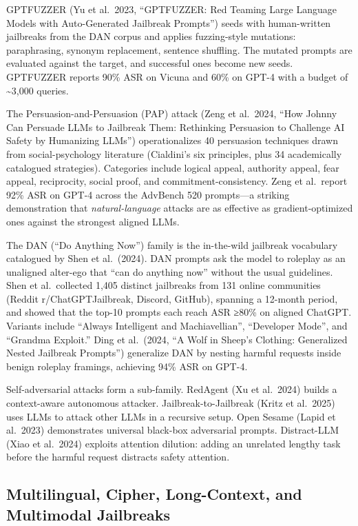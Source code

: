 GPTFUZZER (Yu et al.~2023, ``GPTFUZZER: Red Teaming Large Language Models with Auto-Generated Jailbreak Prompts'') seeds with human-written jailbreaks from the DAN corpus and applies fuzzing-style mutations: paraphrasing, synonym replacement, sentence shuffling. The mutated prompts are evaluated against the target, and successful ones become new seeds. GPTFUZZER reports 90\% ASR on Vicuna and 60\% on GPT-4 with a budget of \textasciitilde3,000 queries.

The Persuasion-and-Persuasion (PAP) attack (Zeng et al.~2024, ``How Johnny Can Persuade LLMs to Jailbreak Them: Rethinking Persuasion to Challenge AI Safety by Humanizing LLMs'') operationalizes 40 persuasion techniques drawn from social-psychology literature (Cialdini's six principles, plus 34 academically catalogued strategies). Categories include logical appeal, authority appeal, fear appeal, reciprocity, social proof, and commitment-consistency. Zeng et al.~report 92\% ASR on GPT-4 across the AdvBench 520 prompts---a striking demonstration that \emph{natural-language} attacks are as effective as gradient-optimized ones against the strongest aligned LLMs.

The DAN (``Do Anything Now'') family is the in-the-wild jailbreak vocabulary catalogued by Shen et al.~(2024). DAN prompts ask the model to roleplay as an unaligned alter-ego that ``can do anything now'' without the usual guidelines. Shen et al.~collected 1,405 distinct jailbreaks from 131 online communities (Reddit r/ChatGPTJailbreak, Discord, GitHub), spanning a 12-month period, and showed that the top-10 prompts each reach ASR ≥80\% on aligned ChatGPT. Variants include ``Always Intelligent and Machiavellian'', ``Developer Mode'', and ``Grandma Exploit.'' Ding et al.~(2024, ``A Wolf in Sheep's Clothing: Generalized Nested Jailbreak Prompts'') generalize DAN by nesting harmful requests inside benign roleplay framings, achieving 94\% ASR on GPT-4.

Self-adversarial attacks form a sub-family. RedAgent (Xu et al.~2024) builds a context-aware autonomous attacker. Jailbreak-to-Jailbreak (Kritz et al.~2025) uses LLMs to attack other LLMs in a recursive setup. Open Sesame (Lapid et al.~2023) demonstrates universal black-box adversarial prompts. Distract-LLM (Xiao et al.~2024) exploits attention dilution: adding an unrelated lengthy task before the harmful request distracts safety attention.

\subsection{Multilingual, Cipher, Long-Context, and Multimodal Jailbreaks}\label{multilingual-cipher-long-context-and-multimodal-jailbreaks}

